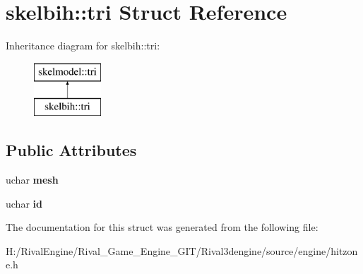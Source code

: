 \hypertarget{structskelbih_1_1tri}{}\section{skelbih\+:\+:tri Struct Reference}
\label{structskelbih_1_1tri}
Inheritance diagram for skelbih\+:\+:tri\+:\begin{figure}[H]
\begin{center}
\leavevmode
\includegraphics[height=2.000000cm]{structskelbih_1_1tri}
\end{center}
\end{figure}
\subsection*{Public Attributes}
\begin{DoxyCompactItemize}
\item 
\mbox{\label{structskelbih_1_1tri_ab06020f8dbe82372abf0565355788b8f}} 
uchar {\bfseries mesh}
\item 
\mbox{\label{structskelbih_1_1tri_aa94e0b048689bb7ef1783d5203351109}} 
uchar {\bfseries id}
\end{DoxyCompactItemize}


The documentation for this struct was generated from the following file\+:\begin{DoxyCompactItemize}
\item 
H\+:/\+Rival\+Engine/\+Rival\+\_\+\+Game\+\_\+\+Engine\+\_\+\+G\+I\+T/\+Rival3dengine/source/engine/hitzone.\+h\end{DoxyCompactItemize}

